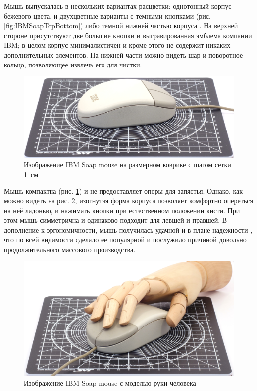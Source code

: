 \documentclass[11pt, a4paper]{article}
\begin{document}
Мышь выпускалась в нескольких вариантах расцветки: однотонный корпус бежевого цвета, и двухцветные варианты с темными кнопками (рис. \ref{fig:IBMSoapTopBottom}) либо темной нижней частью корпуса \cite{hugold}. На верхней стороне присутствуют две большие кнопки и выгравированная эмблема компании IBM; в целом корпус минималистичен и кроме этого не содержит никаких дополнительных элементов. На нижней части можно видеть шар и поворотное кольцо, позволяющее извлечь его для чистки.

\begin{figure}[h]
    \centering
    \includegraphics[scale=0.34]{1992_ibm_soap_mouse/size_30.jpg}
    \caption{Изображение IBM Soap mouse на размерном коврике с шагом сетки 1~см}
    \label{fig:IBMSoapSize}
\end{figure}

Мышь компактна (рис. \ref{fig:IBMSoapSize}) и не предоставляет опоры для запястья.
Однако, как можно видеть на рис. \ref{fig:IBMSoapHand}, изогнутая форма корпуса позволяет комфортно опереться на неё ладонью, и нажимать кнопки при естественном положении кисти. При этом мышь симметрична и одинаково подходит для левшей и правшей. В дополнение к эргономичности, мышь получилась удачной и в плане надежности \cite{usage}, что по всей видимости сделало ее популярной и послужило причиной довольно продолжительного массового производства.

\begin{figure}[h]
    \centering
    \includegraphics[scale=0.34]{1992_ibm_soap_mouse/hand_30.jpg}
    \caption{Изображение IBM Soap mouse с моделью руки человека}
    \label{fig:IBMSoapHand}
\end{figure}
\end{document}
